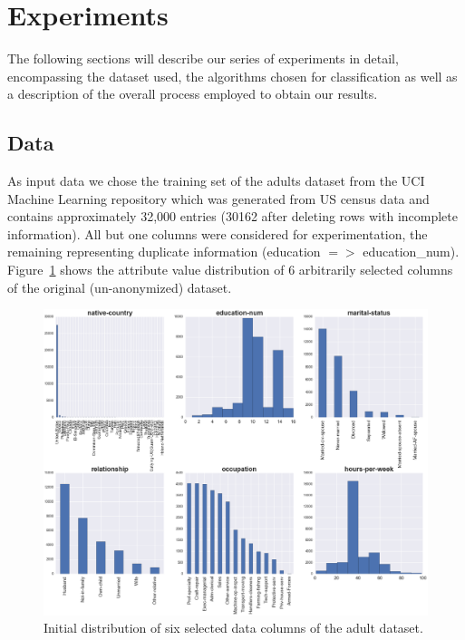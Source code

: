 \documentclass{llncs}
\begin{document}
\section{Experiments}
\label{sect:experiments}

The following sections will describe our series of experiments in detail, encompassing the dataset used, the algorithms chosen for classification as well as a description of the overall process employed to obtain our results.


\subsection{Data} 
\label{ssect:data}

As input data we chose the training set of the adults dataset from the UCI Machine Learning repository which was generated from US census data and contains approximately 32,000 entries (30162 after deleting rows with incomplete information). All but one columns were considered for experimentation, the remaining representing duplicate information (education $=>$ education\_num). Figure~\ref{fig:adult_original_distribution} shows the attribute value distribution of 6 arbitrarily selected columns of the original (un-anonymized) dataset.


\begin{figure}[H]
	\begin{center}
    \hspace*{-0.8cm}
		\includegraphics[width=1.1\textwidth]{figures/theory/dist_initial_small}
		\caption{Initial distribution of six selected data columns of the adult dataset.}
		\label{fig:adult_original_distribution}
	\end{center}
\end{figure}
\end{document}
